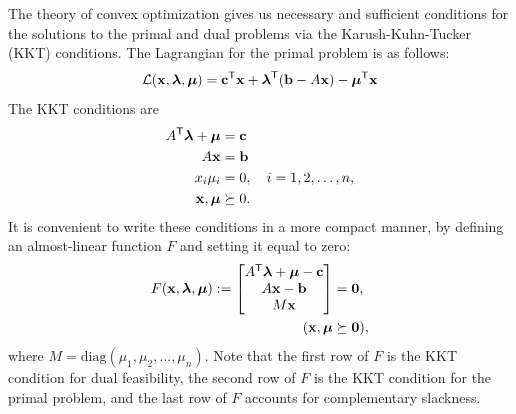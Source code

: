 The theory of convex optimization gives us necessary and sufficient conditions for the solutions to the primal and dual problems via the Karush-Kuhn-Tucker (KKT) conditions.
The Lagrangian for the primal problem is as follows:
\[
\mathcal{L}(\mathbf{x}, \boldsymbol{\lambda}, \boldsymbol{\mu})
= \mathbf{c}^{\mathsf T} \mathbf{x} + \boldsymbol{\lambda}^{\mathsf T} (\mathbf{b} - A\mathbf{x}) - \boldsymbol{\mu}^{\mathsf T} \mathbf{x}
\]
The KKT conditions are
\begin{align*}
A^{\mathsf T} \boldsymbol{\lambda} + \boldsymbol{\mu} &= \mathbf{c}\\
A\mathbf{x} &= \mathbf{b}\\
x_i\mu_i &= 0, \quad i = 1,2,\ldots,n,\\
\mathbf{x}, \boldsymbol{\mu} &\succeq 0.
\end{align*}
It is convenient to write these conditions in a more compact manner, by defining an almost-linear function $F$ and setting it equal to zero:
\begin{align*}
F(\mathbf{x},\boldsymbol{\lambda},\boldsymbol{\mu}) :=
\begin{bmatrix}
A^{\mathsf T} \boldsymbol{\lambda} + \boldsymbol{\mu} - \mathbf{c}\\
A\mathbf{x} - \mathbf{b}\\
M\mathbf{x}\\
\end{bmatrix}
&= \mathbf{0},\\
(\mathbf{x},\boldsymbol{\mu} &\succeq \mathbf{0}),
\end{align*}
where $M = \text{diag}(\mu_1,\mu_2,\ldots,\mu_n)$.
Note that the first row of $F$ is the KKT condition for dual feasibility, the second row of $F$ is the KKT condition for the primal problem, and the last row of $F$ accounts for complementary slackness.

